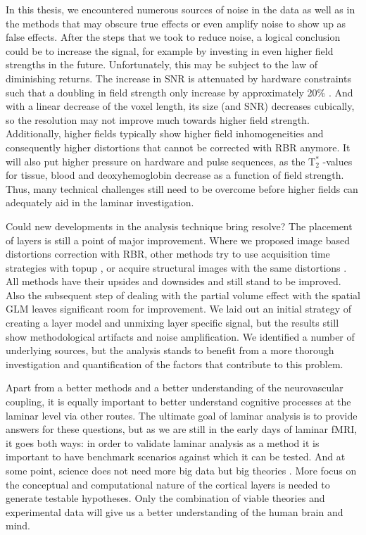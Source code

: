 In this thesis, we encountered numerous sources of noise in the data as well as in the methods that may obscure true effects or even amplify noise to show up as false effects. After the steps that we took to reduce noise, a logical conclusion could be to increase the signal, for example by investing in even higher field strengths in the future. Unfortunately, this may be subject to the law of diminishing returns. The increase in SNR is attenuated by hardware constraints such that a doubling in field strength only increase by approximately 20\% \cite{?}. 
And with a linear decrease of the voxel length, its size (and SNR) decreases cubically, so the resolution may not improve much towards higher field strength. Additionally, higher fields typically show higher field inhomogeneities and consequently higher distortions that cannot be corrected with RBR anymore. It will also put higher pressure on hardware and pulse sequences, as the T$_2^*$ -values for tissue, blood and deoxyhemoglobin decrease as a function of field strength. Thus, many technical challenges still need to be overcome before higher fields can adequately aid in the laminar investigation.

Could new developments in the analysis technique bring resolve? The placement of layers is still a point of major improvement. Where we proposed image based distortions correction with RBR, other methods try to use acquisition time strategies with topup \cite{Smith2004}, or acquire structural images with the same distortions \cite{Kashyap2017}. All methods have their upsides and downsides and still stand to be improved. Also the subsequent step of dealing with the partial volume effect with the spatial GLM leaves significant room for improvement. We laid out an initial strategy of creating a layer model and unmixing layer specific signal, but the results still show methodological artifacts and noise amplification. We identified a number of underlying sources, but the analysis stands to benefit from a more thorough investigation and quantification of the factors that contribute to this problem. 

Apart from a better methods and a better understanding of the neurovascular coupling, it is equally important to better understand cognitive processes at the laminar level via other routes. The ultimate goal of laminar analysis is to provide answers for these questions, but as we are still in the early days of laminar fMRI, it goes both ways: in order to validate laminar analysis as a method it is important to have benchmark scenarios against which it can be tested. And at some point, science does not need more big data but big theories \cite{Jensen2014}. More focus on the conceptual and computational nature of the cortical layers is needed to generate testable hypotheses. Only the combination of viable theories and experimental data will give us a better understanding of the human brain and mind. 



